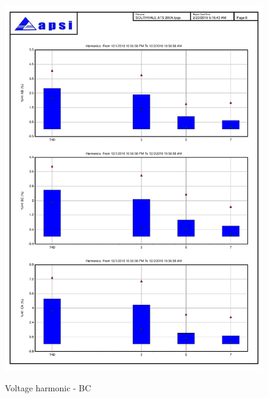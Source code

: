 \begin{figure}
	\includegraphics[width=\textwidth]{figures/fig_ch04_elecaudit_harmonicstudy02} \\
	\caption{Voltage harmonic - BC}
	\label{fig_ch04_elecaudit_harmonicstudy02} 
\end{figure}

